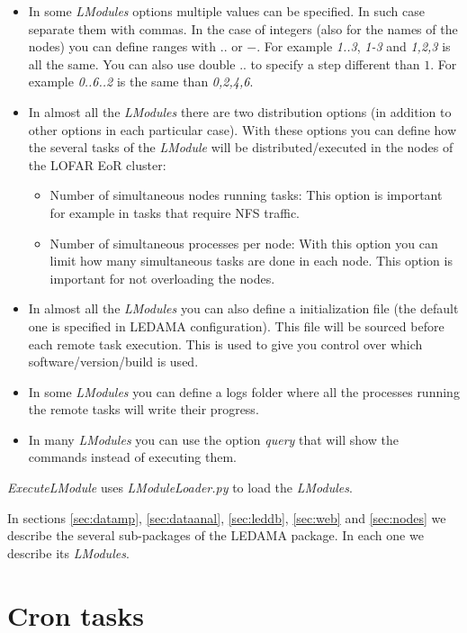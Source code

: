 \documentclass[a4paper,11pt]{article}
\begin{document}
\begin{itemize}
    \item In some \textit{LModules} options multiple values can be specified. In such case separate them with commas. In the case of integers (also for the names of the nodes) you can define ranges with $..$ or $-$. For example \textit{1..3}, \textit{1-3} and \textit{1,2,3} is all the same. You can also use double $..$ to specify a step different than $1$. For example \textit{0..6..2} is the same than \textit{0,2,4,6}.
    \item In almost all the \textit{LModules} there are two distribution options (in addition to other options in each particular case). With these options you can define how the several tasks of the \textit{LModule} will be distributed/executed in the nodes of the LOFAR EoR cluster:
    \begin{itemize}
        \item Number of simultaneous nodes running tasks: This option is important for example in tasks that require NFS traffic.
        \item Number of simultaneous processes per node: With this option you can limit how many simultaneous tasks are done in each node. This option is important for not overloading the nodes.
    \end{itemize}  
    \item In almost all the \textit{LModules} you can also define a initialization file (the default one is specified in LEDAMA configuration). This file will be sourced before each remote task execution. This is used to give you control over which software/version/build is used.
    \item In some \textit{LModules} you can define a logs folder where all the processes running the remote tasks will write their progress.
    \item In many \textit{LModules} you can use the option \textit{query} that will show the commands instead of executing them.
\end{itemize}

\textit{ExecuteLModule} uses \textit{LModuleLoader.py} to load the \textit{LModules}.

In sections \ref{sec:datamp}, \ref{sec:dataanal}, \ref{sec:leddb}, \ref{sec:web} and \ref{sec:nodes} we describe the several sub-packages of the LEDAMA package. In each one we describe its \textit{LModules}.

\section{Cron tasks}
\end{document}
